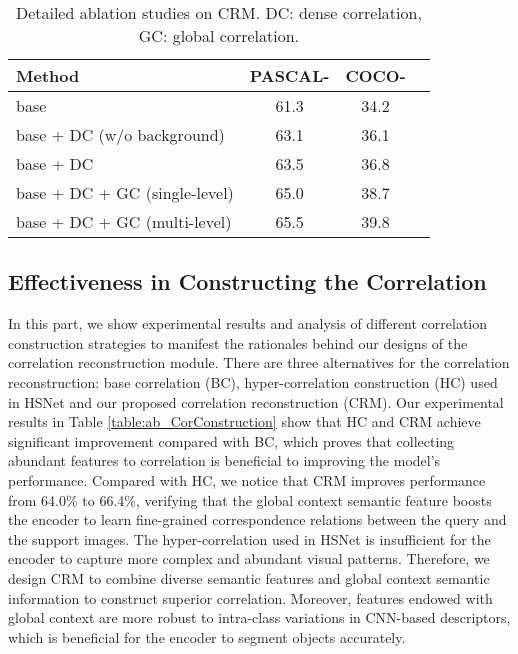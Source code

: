 \documentclass[journal]{IEEEtran}
\begin{document}
\begin{table}[htb]
	\renewcommand\arraystretch{1.2}
	\caption{Detailed ablation studies on CRM. DC: dense correlation, GC: global correlation.}
	\label{table:ab_module_crm}
	\setlength{\tabcolsep}{2.8mm}
	\begin{center}
		\begin{tabular}{lccc}
			\hline
			\textbf{Method} & \textbf{PASCAL-} &  {\textbf{COCO-}}\\
			\hline
			base   & 61.3  &  {34.2} \\
			base + DC (w/o background)   & 63.1  &  {36.1} \\
			base + DC   & 63.5  &  {36.8} \\
			base + DC  + GC (single-level)  & 65.0  &  {38.7} \\
			base + DC  + GC (multi-level)  & 65.5  &  {39.8} \\
			\hline
		\end{tabular}
	\end{center}
\end{table}









\subsection{Effectiveness in Constructing the Correlation} 
\label{subsec_ab}
In this part, we show experimental results and analysis of different correlation construction strategies to manifest the rationales behind our designs of the correlation reconstruction module. There are three alternatives for the correlation reconstruction: base correlation (BC), hyper-correlation construction (HC) used in HSNet and our proposed correlation reconstruction (CRM). Our experimental results in Table \ref{table:ab_CorConstruction} show that HC and CRM achieve significant improvement compared with BC, which proves that collecting abundant features to correlation is beneficial to improving the model's performance. Compared with HC, we notice that CRM improves performance from 64.0\% to 66.4\%, verifying that the global context semantic feature boosts the encoder to learn fine-grained correspondence relations between the query and the support images. The hyper-correlation used in HSNet is insufficient for the encoder to capture more complex and abundant visual patterns. Therefore, we design CRM to combine diverse semantic features and global context semantic information to construct superior correlation. Moreover, features endowed with global context are more robust to intra-class variations in CNN-based descriptors, which is beneficial for the encoder to segment objects accurately. \par 
\end{document}
